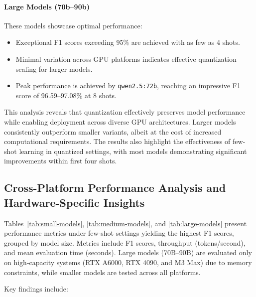 \documentclass[conference]{IEEEtran}
\begin{document}
\paragraph{Large Models (70b--90b)} These models showcase optimal performance:
\begin{itemize}
    \item Exceptional F1 scores exceeding 95\% are achieved with as few as 4 shots.
    \item Minimal variation across GPU platforms indicates effective quantization scaling for larger models.
    \item Peak performance is achieved by \texttt{qwen2.5:72b}, reaching an impressive F1 score of 96.59--97.08\% at 8 shots.
\end{itemize}


This analysis reveals that quantization effectively preserves model performance while enabling deployment across diverse GPU architectures. Larger models consistently outperform smaller variants, albeit at the cost of increased computational requirements. The results also highlight the effectiveness of few-shot learning in quantized settings, with most models demonstrating significant improvements within first four shots.

\subsection{Cross-Platform Performance Analysis and Hardware-Specific Insights}
\label{sec:cross-platform}

Tables~\ref{tab:small-models}, \ref{tab:medium-models}, and \ref{tab:large-models} present performance metrics under few-shot settings yielding the highest F1 scores, grouped by model size. Metrics include F1 scores, throughput (tokens/second), and mean evaluation time (seconds). Large models (70B–90B) are evaluated only on high-capacity systems (RTX A6000, RTX 4090, and M3 Max) due to memory constraints, while smaller models are tested across all platforms.

Key findings include:
\end{document}
